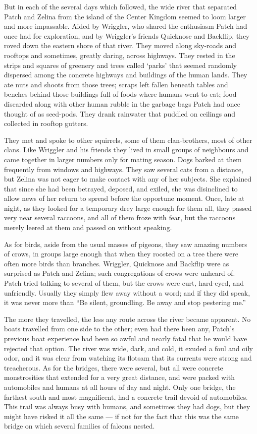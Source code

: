 \documentclass[12pt]{memoir}
\begin{document}
But in each of the several days which followed, the wide river that
separated Patch and Zelina from the island of the Center Kingdom
seemed to loom larger and more impassable. Aided by Wriggler, who
shared the enthusiasm Patch had once had for exploration, and by
Wriggler’s friends Quicknose and Backflip, they roved down the eastern
shore of that river. They moved along sky-roads and rooftops and
sometimes, greatly daring, across highways. They rested in the strips
and squares of greenery and trees called ‘parks’ that seemed randomly
dispersed among the concrete highways and buildings of the human
lands. They ate nuts and shoots from those trees; scraps left fallen
beneath tables and benches behind those buildings full of foods where
humans went to eat; food discarded along with other human rubble in
the garbage bags Patch had once thought of as seed-pods. They drank
rainwater that puddled on ceilings and collected in rooftop gutters.

They met and spoke to other squirrels, some of them clan-brothers,
most of other clans. Like Wriggler and his friends they lived in small
groups of neighbours and came together in larger numbers only for
mating season. Dogs barked at them frequently from windows and
highways. They saw several cats from a distance, but Zelina was not
eager to make contact with any of her subjects. She explained that
since she had been betrayed, deposed, and exiled, she was disinclined
to allow news of her return to spread before the opportune
moment. Once, late at night, as they looked for a temporary drey large
enough for them all, they passed very near several raccoons, and all
of them froze with fear, but the raccoons merely leered at them and
passed on without speaking.

As for birds, aside from the usual masses of pigeons, they saw amazing
numbers of crows, in groups large enough that when they roosted on a
tree there were often more birds than branches. Wriggler, Quicknose
and Backflip were as surprised as Patch and Zelina; such congregations
of crows were unheard of. Patch tried talking to several of them, but
the crows were curt, hard-eyed, and unfriendly. Usually they simply
flew away without a word; and if they did speak, it was never more
than “Be silent, groundling. Be away and stop pestering me.”

The more they travelled, the less any route across the river became
apparent. No boats travelled from one side to the other; even had
there been any, Patch’s previous boat experience had been so awful and
nearly fatal that he would have rejected that option. The river was
wide, dark, and cold, it exuded a foul and oily odor, and it was clear
from watching its flotsam that its currents were strong and
treacherous. As for the bridges, there were several, but all were
concrete monstrosities that extended for a very great distance, and
were packed with automobiles and humans at all hours of day and
night. Only one bridge, the farthest south and most magnificent, had a
concrete trail devoid of automobiles. This trail was always busy with
humans, and sometimes they had dogs, but they might have risked it all
the same — if not for the fact that this was the same bridge on which
several families of falcons nested.
\end{document}
